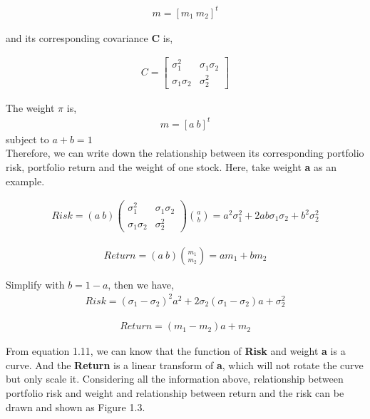 \documentclass[paper=a4, fontsize=11pt]{article} %
\numberwithin{equation}{section} %
\numberwithin{figure}{section} %
\numberwithin{table}{section} %
\begin{document}
\begin{align}
m = [m_1\ m_2]^{t}
\end{align}

and its corresponding covariance \textbf{C} is, 

\begin{align}
C = \begin{bmatrix}
\sigma_{1}^{2} & \sigma_{1}\sigma_{2}\\ 
\sigma_{1}\sigma_{2} & \sigma_{2}^{2}
\end{bmatrix}
\end{align}

The weight $\pi$ is, 
\begin{align}
m = [a\ b]^{t}
\end{align}
subject to $a+b=1$ \\

Therefore, we can write down the relationship between its corresponding portfolio risk, portfolio return and the weight of one stock. Here, take weight \textbf{a} as an example. 

\begin{align}
Risk =(a\ b)\begin{pmatrix}
\sigma_{1}^{2} & \sigma_{1}\sigma_{2}\\ 
\sigma_{1}\sigma_{2} & \sigma_{2}^{2}
\end{pmatrix}\binom{a}{b}=a^{2}\sigma _{1}^{2}+2ab\sigma _{1}\sigma _{2}+b^{2}\sigma _{2}^{2}
\end{align}

\begin{align}
Return = (a\ b)\binom{m_1}{m_2} = am_1 +bm_2
\end{align}

Simplify with $b=1-a$, then we have,
\begin{align}
Risk =(\sigma _{1}-\sigma _{2})^{2}a^{2}+2\sigma _{2}(\sigma _{1}-\sigma _{2})a+\sigma _{2}^{2}
\end{align}

\begin{align}
Return = (m_{1}-m_{2})a+m_{2}
\end{align}

From equation 1.11, we can know that the function of \textbf{Risk} and weight \textbf{a} is a curve. And the \textbf{Return} is a linear transform of \textbf{a}, which will not rotate the curve but only scale it. Considering all the information above, relationship between portfolio risk and weight and relationship between return and the risk can be drawn and shown as Figure 1.3.
\end{document}
